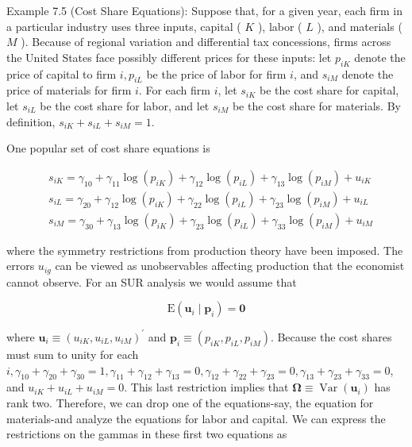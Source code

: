 \documentclass[10pt]{article}
\begin{document}
Example 7.5 (Cost Share Equations): Suppose that, for a given year, each firm in a particular industry uses three inputs, capital ( $K$ ), labor ( $L$ ), and materials ( $M$ ). Because of regional variation and differential tax concessions, firms across the United States face possibly different prices for these inputs: let $p_{i K}$ denote the price of capital to firm $i, p_{i L}$ be the price of labor for firm $i$, and $s_{i M}$ denote the price of materials for firm $i$. For each firm $i$, let $s_{i K}$ be the cost share for capital, let $s_{i L}$ be the cost share for labor, and let $s_{i M}$ be the cost share for materials. By definition, $s_{i K}+s_{i L}+s_{i M}=1$.

One popular set of cost share equations is


\begin{align*}
& s_{i K}=\gamma_{10}+\gamma_{11} \log \left(p_{i K}\right)+\gamma_{12} \log \left(p_{i L}\right)+\gamma_{13} \log \left(p_{i M}\right)+u_{i K}  \tag{7.60}\\
& s_{i L}=\gamma_{20}+\gamma_{12} \log \left(p_{i K}\right)+\gamma_{22} \log \left(p_{i L}\right)+\gamma_{23} \log \left(p_{i M}\right)+u_{i L}  \tag{7.61}\\
& s_{i M}=\gamma_{30}+\gamma_{13} \log \left(p_{i K}\right)+\gamma_{23} \log \left(p_{i L}\right)+\gamma_{33} \log \left(p_{i M}\right)+u_{i M} \tag{7.62}
\end{align*}


where the symmetry restrictions from production theory have been imposed. The errors $u_{i g}$ can be viewed as unobservables affecting production that the economist cannot observe. For an SUR analysis we would assume that


\begin{equation*}
\mathrm{E}\left(\mathbf{u}_{i} \mid \mathbf{p}_{i}\right)=\mathbf{0} \tag{7.63}
\end{equation*}


where $\mathbf{u}_{i} \equiv\left(u_{i K}, u_{i L}, u_{i M}\right)^{\prime}$ and $\mathbf{p}_{i} \equiv\left(p_{i K}, p_{i L}, p_{i M}\right)$. Because the cost shares must sum to unity for each $i, \gamma_{10}+\gamma_{20}+\gamma_{30}=1, \gamma_{11}+\gamma_{12}+\gamma_{13}=0, \gamma_{12}+\gamma_{22}+\gamma_{23}=0, \gamma_{13}+ \gamma_{23}+\gamma_{33}=0$, and $u_{i K}+u_{i L}+u_{i M}=0$. This last restriction implies that $\boldsymbol{\Omega} \equiv \operatorname{Var}\left(\mathbf{u}_{i}\right)$ has rank two. Therefore, we can drop one of the equations-say, the equation for materials-and analyze the equations for labor and capital. We can express the\\
restrictions on the gammas in these first two equations as
\end{document}

